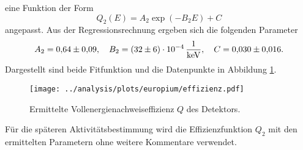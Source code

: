 eine Funktion der Form
\begin{equation*}
  Q_2(E)=A_2\exp\left(-B_2 E\right)+C
\end{equation*}
angepasst. Aus der Regressionsrechnung ergeben sich die folgenden Parameter
\begin{equation}
\label{eq:effizienz_Q_2}
A_2 = \num{0.64\pm0.09}, \quad B_2=\SI{32\pm6 e-4}{\per\kilo\eV}, \quad C = \num{0.030\pm0.016}.
\end{equation}
Dargestellt sind beide Fitfunktion und die Datenpunkte in Abbildung \ref{fig:effizienz}.
\begin{figure}
  \centering
  \texttt{[image: ../analysis/plots/europium/effizienz.pdf]}
  \caption{Ermittelte Vollenergienachweiseffizienz $Q$ des Detektors.}
  \label{fig:effizienz}
\end{figure}
Für die späteren Aktivitätsbestimmung wird die Effizienzfunktion $Q_2$ mit den
ermittelten Parametern ohne weitere Kommentare verwendet.
